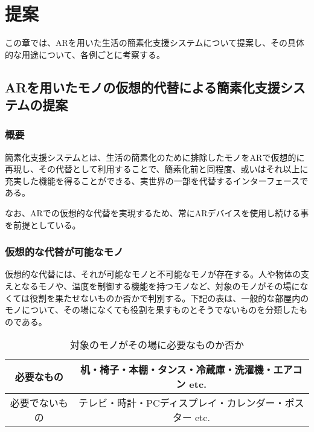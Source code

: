 
\chapter{提案}
\label{chap:suggestion}

この章では、ARを用いた生活の簡素化支援システムについて提案し、その具体的な用途について、各例ごとに考察する。

\newpage

\section{ARを用いたモノの仮想的代替による簡素化支援システムの提案}
\label{chap:suggestionDetail}

\subsection{概要}

簡素化支援システムとは、生活の簡素化のために排除したモノをARで仮想的に再現し、その代替として利用することで、簡素化前と同程度、或いはそれ以上に充実した機能を得ることができる、実世界の一部を代替するインターフェースである。

なお、ARでの仮想的な代替を実現するため、常にARデバイスを使用し続ける事を前提としている。

\subsection{仮想的な代替が可能なモノ}

仮想的な代替には、それが可能なモノと不可能なモノが存在する。人や物体の支えとなるモノや、温度を制御する機能を持つモノなど、対象のモノがその場になくては役割を果たせないものか否かで判別する。下記の表は、一般的な部屋内のモノについて、その場になくても役割を果すものとそうでないものを分類したものである。

\begin{table}[htbp]
    \caption{対象のモノがその場に必要なものか否か}
    \label{tb:mono}
    \begin{center}\begin{tabular}{c|c}
      \hline
      必要なもの&机・椅子・本棚・タンス・冷蔵庫・洗濯機・エアコン etc.\\\hline
      必要でないもの&テレビ・時計・PCディスプレイ・カレンダー・ポスター etc.\\\hline
    \end{tabular}\end{center}
\end{table}

